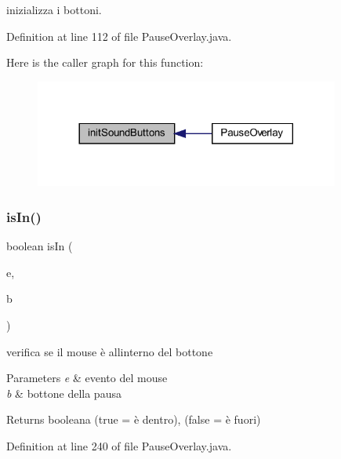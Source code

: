 inizializza i bottoni. 



Definition at line 112 of file Pause\+Overlay.\+java.

Here is the caller graph for this function\+:\nopagebreak
\begin{figure}[H]
\begin{center}
\leavevmode
\includegraphics[width=284pt]{classui_1_1_pause_overlay_a7f98f78449c3156b81769d481bf99f3c_icgraph}
\end{center}
\end{figure}
\mbox{\label{classui_1_1_pause_overlay_a1652ba7734cc8d8ba710d3ab10281b04}} 
\subsubsection{\texorpdfstring{is\+In()}{isIn()}}
{\footnotesize\ttfamily boolean is\+In (\begin{DoxyParamCaption}\item[{Mouse\+Event}]{e,  }\item[{\hyperlink{classui_1_1_pause_button}{Pause\+Button}}]{b }\end{DoxyParamCaption})}



verifica se il mouse è all\textquotesingle{}interno del bottone 


\begin{DoxyParams}{Parameters}
{\em e} & evento del mouse \\
\hline
{\em b} & bottone della pausa\\
\hline
\end{DoxyParams}
\begin{DoxyReturn}{Returns}
booleana (true = è dentro), (false = è fuori) 
\end{DoxyReturn}


Definition at line 240 of file Pause\+Overlay.\+java.

